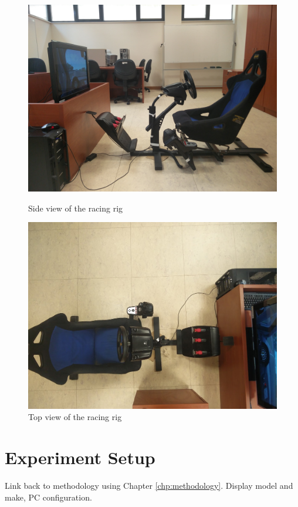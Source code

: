 \begin{figure}
	\centering
	\begin{minipage}{0.45\textwidth}
		\centering
		\includegraphics[width=\textwidth]{images/RacingRig}
		\caption{Side view of the racing rig}
	\end{minipage}\hfill
	\begin{minipage}{0.45\textwidth}
		\centering
		\includegraphics[width=\textwidth]{images/RacingRig2}
		\caption{Top view of the racing rig}
	\end{minipage}
\end{figure}

\section{Experiment Setup}
\label{sec:imp-simRacingRig}
Link back to methodology using Chapter \ref{chp:methodology}.
Display model and make, PC configuration. 

